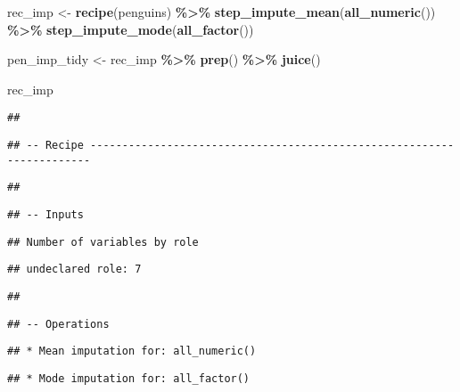 \documentclass[
]{article}
\newenvironment{Shaded}{\begin{snugshade}}{\end{snugshade}}
\newcommand{\FunctionTok}[1]{\textcolor[rgb]{0.13,0.29,0.53}{\textbf{#1}}}
\newcommand{\NormalTok}[1]{#1}
\newcommand{\OtherTok}[1]{\textcolor[rgb]{0.56,0.35,0.01}{#1}}
\newcommand{\SpecialCharTok}[1]{\textcolor[rgb]{0.81,0.36,0.00}{\textbf{#1}}}
\begin{document}
\begin{Shaded}
\begin{Highlighting}[]
\NormalTok{rec\_imp }\OtherTok{\textless{}{-}} \FunctionTok{recipe}\NormalTok{(penguins) }\SpecialCharTok{\%\textgreater{}\%} 
  \FunctionTok{step\_impute\_mean}\NormalTok{(}\FunctionTok{all\_numeric}\NormalTok{()) }\SpecialCharTok{\%\textgreater{}\%} 
  \FunctionTok{step\_impute\_mode}\NormalTok{(}\FunctionTok{all\_factor}\NormalTok{())}

\NormalTok{pen\_imp\_tidy }\OtherTok{\textless{}{-}}\NormalTok{ rec\_imp }\SpecialCharTok{\%\textgreater{}\%} \FunctionTok{prep}\NormalTok{() }\SpecialCharTok{\%\textgreater{}\%} \FunctionTok{juice}\NormalTok{()}

\NormalTok{rec\_imp}
\end{Highlighting}
\end{Shaded}

\begin{verbatim}
## 
\end{verbatim}

\begin{verbatim}
## -- Recipe ----------------------------------------------------------------------
\end{verbatim}

\begin{verbatim}
## 
\end{verbatim}

\begin{verbatim}
## -- Inputs
\end{verbatim}

\begin{verbatim}
## Number of variables by role
\end{verbatim}

\begin{verbatim}
## undeclared role: 7
\end{verbatim}

\begin{verbatim}
## 
\end{verbatim}

\begin{verbatim}
## -- Operations
\end{verbatim}

\begin{verbatim}
## * Mean imputation for: all_numeric()
\end{verbatim}

\begin{verbatim}
## * Mode imputation for: all_factor()
\end{verbatim}
\end{document}
